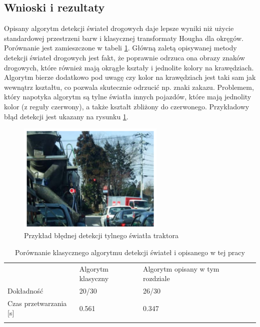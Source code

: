 \subsection{Wnioski i rezultaty}
Opisany algorytm detekcji świateł drogowych daje lepsze wyniki niż użycie standardowej przestrzeni barw i klasycznej transformaty Hougha dla okręgów. Porównanie jest zamieszczone w tabeli \ref{tab:tl_results}. Główną zaletą opisywanej metody detekcji świateł drogowych jest fakt, że poprawnie odrzuca ona obrazy znaków drogowych, które również mają okrągłe kształy i jednolite kolory na krawędziach. Algorytm bierze dodatkowo pod uwagę czy kolor na krawędziach jest taki sam jak wewnątrz kształtu, co pozwala skutecznie odrzucić np. znaki zakazu.
Problemem, który napotyka algorytm są tylne światła innych pojazdów, które mają jednolity kolor (z reguły czerwony), a także kształt zbliżony do czerwonego. Przykładowy błąd detekcji jest ukazany na rysunku \ref{fig:tl_err}.

\begin{figure}
  \centering
  \includegraphics[width=7cm]{img/tl_err.png}
  \caption{Przykład błędnej detekcji tylnego światła traktora\cite{T4}}
  \label{fig:tl_err}
\end{figure}

\begin{table}[]
\centering
\caption{Porównanie klasycznego algorytmu detekcji świateł i opisanego w tej pracy\cite{T4}}
\begin{tabular}{lllll}
\cline{1-3}
\multicolumn{1}{|l|}{}                           & \multicolumn{1}{l|}{Algorytm klasyczny} & \multicolumn{1}{l|}{Algorytm opisany w tym rozdziale} &  &  \\ \cline{1-3}
\multicolumn{1}{|l|}{Dokładność}                 & \multicolumn{1}{l|}{20/30}              & \multicolumn{1}{l|}{26/30}                            &  &  \\ \cline{1-3}
\multicolumn{1}{|l|}{Czas przetwarzania {[}s{]}} & \multicolumn{1}{l|}{0.561}              & \multicolumn{1}{l|}{0.347}                            &  &  \\ \cline{1-3}
                                                 &                                         &                                                       &  & 
\end{tabular}
\label{tab:tl_results}
\end{table}



